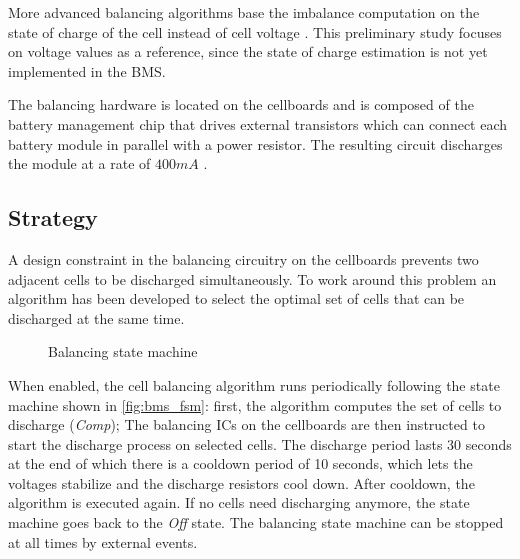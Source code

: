 More advanced balancing algorithms base the imbalance computation on the state of charge of the cell instead of cell voltage \cite{8834858}. This preliminary study focuses on voltage values as a reference, since the state of charge estimation is not yet implemented in the BMS.

The balancing hardware is located on the cellboards and is composed of the battery management chip that drives external transistors which can connect each battery module in parallel with a power resistor. The resulting circuit discharges the module at a rate of $400 mA$ \cite{fenice-bms-hv}.

\subsection{Strategy}
A design constraint in the balancing circuitry on the cellboards prevents two adjacent cells to be discharged simultaneously. To work around this problem an algorithm has been developed to select the optimal set of cells that can be discharged at the same time.

\begin{figure}[h]
    \centering
    
    \caption{Balancing state machine}
    \label{fig:bms_fsm}
\end{figure}

When enabled, the cell balancing algorithm runs periodically following the state machine shown in \autoref{fig:bms_fsm}: first, the algorithm computes the set of cells to discharge (\textit{Comp}); The balancing ICs on the cellboards are then instructed to start the discharge process on selected cells. The discharge period lasts 30 seconds at the end of which there is a cooldown period of 10 seconds, which lets the voltages stabilize and the discharge resistors cool down. After cooldown, the algorithm is executed again. If no cells need discharging anymore, the state machine goes back to the \textit{Off} state. The balancing state machine can be stopped at all times by external events.

